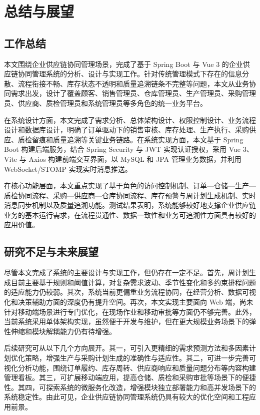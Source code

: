 \chapter{总结与展望}

\section{工作总结}

本文围绕企业供应链协同管理场景，完成了基于 Spring Boot 与 Vue 3 的企业供应链协同管理系统的分析、设计与实现工作。针对传统管理模式下存在的信息分散、流程衔接不畅、库存状态不透明和质量追溯链条不完整等问题，本文从业务协同需求出发，设计了覆盖顾客、销售管理员、仓库管理员、生产管理员、采购管理员、供应商、质检管理员和系统管理员等多角色的统一业务平台。

在系统设计方面，本文完成了需求分析、总体架构设计、权限控制设计、业务流程设计和数据库设计，明确了订单驱动下的销售审核、库存处理、生产执行、采购供应、质检留痕和质量追溯等关键业务链路。在系统实现方面，本文基于 Spring Boot 构建后端服务，结合 Spring Security 与 JWT 实现认证授权，采用 Vue 3、Vite 与 Axios 构建前端交互界面，以 MySQL 和 JPA 管理业务数据，并利用 WebSocket/STOMP 实现实时消息推送。

在核心功能层面，本文重点实现了基于角色的访问控制机制、订单—仓储—生产—质检协同流程、采购—供应商—仓库协同流程、库存预警与周计划生成机制、实时消息同步机制以及质量追溯功能。测试结果表明，系统能够较好地支撑企业供应链业务的基本运行需求，在流程贯通性、数据一致性和业务可追溯性方面具有较好的应用价值。

\section{研究不足与未来展望}

尽管本文完成了系统的主要设计与实现工作，但仍存在一定不足。首先，周计划生成目前主要基于规则和阈值计算，对复杂需求波动、季节性变化和多约束排程问题的适应能力仍较弱。其次，系统当前更偏重业务流程协同，在经营分析、数据可视化和决策辅助方面的深度仍有提升空间。再次，本文实现主要面向 Web 端，尚未针对移动端场景进行专门优化，在现场作业和移动审批等方面仍不够完善。此外，当前系统采用单体架构实现，虽然便于开发与维护，但在更大规模业务场景下的弹性伸缩和模块解耦能力仍有待增强。

后续研究可从以下几个方向展开。其一，可引入更精细的需求预测方法和多因素计划优化策略，增强生产与采购计划生成的准确性与适应性。其二，可进一步完善可视化分析功能，围绕订单履约、库存周转、供应商响应和质量问题分布等内容构建管理看板。其三，可扩展移动端应用，提高仓储、质检和采购审批等场景下的便捷性。其四，可探索系统的微服务化改造，增强模块独立部署能力和高并发场景下的系统稳定性。由此可见，企业供应链协同管理系统仍具有较大的优化空间和工程应用前景。